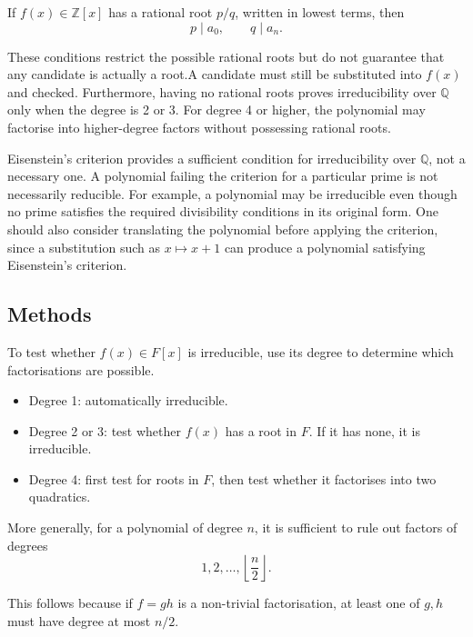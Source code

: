 \begin{mistake}
If \(f(x)\in\mathbb{Z}[x]\) has a rational root \(p/q\), written in lowest terms, then
\[
p\mid a_0,
\qquad
q\mid a_n.
\]

These conditions restrict the possible rational roots but do not guarantee that any candidate is actually a root.A candidate must still be substituted into \(f(x)\) and checked. Furthermore, having no rational roots proves irreducibility over \(\mathbb{Q}\) only when the degree is 2 or 3. For degree 4 or higher, the polynomial may factorise into higher-degree factors without possessing rational roots.
\end{mistake}

\begin{mistake}
Eisenstein's criterion provides a sufficient condition for irreducibility over \(\mathbb{Q}\), not a necessary one. A polynomial failing the criterion for a particular prime is not necessarily reducible. For example, a polynomial may be irreducible even though no prime satisfies the required divisibility conditions in its original form. One should also consider translating the polynomial before applying the criterion, since a substitution such as \(x\mapsto x+1\) can produce a polynomial satisfying Eisenstein's criterion.
\end{mistake}


\subsection{Methods}

\begin{method}
To test whether \(f(x)\in F[x]\) is irreducible, use its degree to determine which factorisations are possible.

\begin{itemize}
    \item Degree 1: automatically irreducible.
    \item Degree 2 or 3: test whether \(f(x)\) has a root in \(F\). If it has none, it is irreducible.
    \item Degree 4: first test for roots in \(F\), then test whether it factorises into two quadratics.
\end{itemize}

More generally, for a polynomial of degree \(n\), it is sufficient to rule out factors of degrees
\[
1,2,\ldots,\left\lfloor\frac n2\right\rfloor.
\]

This follows because if \(f=gh\) is a non-trivial factorisation, at least one of \(g,h\) must have degree at most \(n/2\).
\end{method}


